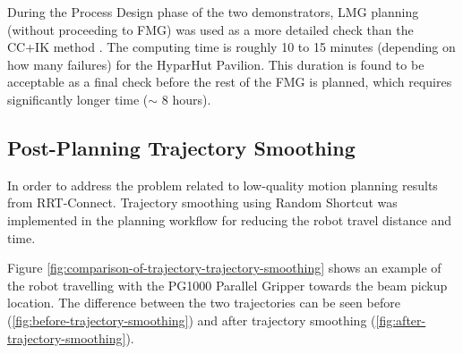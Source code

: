During the Process Design phase of the two demonstrators, LMG planning (without proceeding to FMG) was used as a more detailed check than the CC+IK method . The computing time is roughly 10 to 15 minutes (depending on how many failures) for the HyparHut Pavilion. This duration is found to be acceptable as a final check before the rest of the FMG is planned, which requires significantly longer time ($\sim$ 8 hours).

\subsection{Post-Planning Trajectory Smoothing}
\label{subsection:exploration-4-post-planning-trajectory-smoothing}

In order to address the problem related to low-quality motion planning results from RRT-Connect. Trajectory smoothing using Random Shortcut \parencite{zhaoTrajectorySmoothingUsing2015} was implemented in the planning workflow for reducing the robot travel distance and time.

Figure \ref{fig:comparison-of-trajectory-trajectory-smoothing} shows an example of the robot travelling with the PG1000 Parallel Gripper towards the beam pickup location. The difference between the two trajectories can be seen before (\ref{fig:before-trajectory-smoothing}) and after trajectory smoothing (\ref{fig:after-trajectory-smoothing}). 

